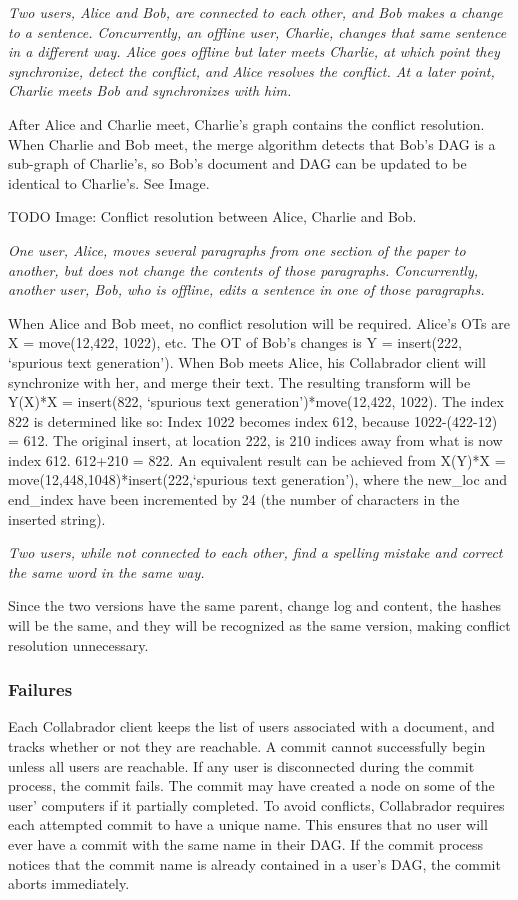 \documentclass[11pt,titlepage]{article}
\begin{document}
\emph{Two users, Alice and Bob, are connected to each other, and Bob
  makes a change to a sentence. Concurrently, an offline user,
  Charlie, changes that same sentence in a different way. Alice goes
  offline but later meets Charlie, at which point they synchronize,
  detect the conflict, and Alice resolves the conflict. At a later
  point, Charlie meets Bob and synchronizes with him.}
  
After Alice and Charlie meet, Charlie's graph contains the conflict
resolution.  When Charlie and Bob meet, the merge algorithm detects
that Bob's DAG is a sub-graph of Charlie's, so Bob's document and DAG
can be updated to be identical to Charlie's.  See Image.

TODO Image: Conflict resolution between Alice, Charlie and Bob.

\emph{One user, Alice, moves several paragraphs from one section of
  the paper to another, but does not change the contents of those
  paragraphs. Concurrently, another user, Bob, who is offline, edits a
  sentence in one of those paragraphs.}

When Alice and Bob meet, no conflict resolution will be
required. Alice's OTs are X = move(12,422, 1022), etc.  The OT of
Bob's changes is Y = insert(222, `spurious text generation'). When Bob
meets Alice, his Collabrador client will synchronize with her, and
merge their text. The resulting transform will be Y(X)*X = insert(822,
`spurious text generation')*move(12,422, 1022). The index 822 is
determined like so: Index 1022 becomes index 612, because
1022-(422-12) = 612.  The original insert, at location 222, is 210
indices away from what is now index 612.  612+210 = 822. An equivalent
result can be achieved from X(Y)*X =
move(12,448,1048)*insert(222,`spurious text generation'), where the
new\_loc and end\_index have been incremented by 24 (the number of
characters in the inserted string).

\emph{Two users, while not connected to each other, find a spelling
  mistake and correct the same word in the same way.}

Since the two versions have the same parent, change log and content,
the hashes will be the same, and they will be recognized as the same
version, making conflict resolution unnecessary.

\subsubsection{Failures}

Each Collabrador client keeps the list of users associated with a
document, and tracks whether or not they are reachable. A commit
cannot successfully begin unless all users are reachable. If any user
is disconnected during the commit process, the commit fails. The
commit may have created a node on some of the user' computers if it
partially completed. To avoid conflicts, Collabrador requires each
attempted commit to have a unique name. This ensures that no user will
ever have a commit with the same name in their DAG. If the commit
process notices that the commit name is already contained in a user's
DAG, the commit aborts immediately.
\end{document}
